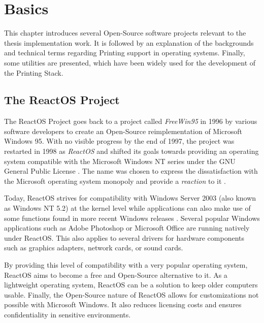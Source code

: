 
\chapter{Basics}
This chapter introduces several Open-Source software projects relevant to the thesis implementation work.
It is followed by an explanation of the backgrounds and technical terms regarding Printing support in operating systems.
Finally, some utilities are presented, which have been widely used for the development of the Printing Stack.


\section{The ReactOS Project}
The ReactOS Project goes back to a project called \emph{FreeWin95} in 1996 by various software developers to create an Open-Source reimplementation of Microsoft Windows 95.
With no visible progress by the end of 1997, the project was restarted in 1998 as \emph{ReactOS} and shifted its goals towards providing an operating system compatible with the Microsoft Windows NT series under the GNU General Public License \cite{reactos1998news}.
The name was chosen to express the dissatisfaction with the Microsoft operating system monopoly and provide a \emph{reaction} to it \cite{sixtus2004reactos}.

Today, ReactOS strives for compatibility with Windows Server 2003 (also known as Windows NT 5.2) at the kernel level while applications can also make use of some functions found in more recent Windows releases \cite{guo2009newsletter54}.
Several popular Windows applications such as Adobe Photoshop or Microsoft Office are running natively under ReactOS.
This also applies to several drivers for hardware components such as graphics adapters, network cards, or sound cards.

By providing this level of compatibility with a very popular operating system, ReactOS aims to become a free and Open-Source alternative to it.
As a lightweight operating system, ReactOS can be a solution to keep older computers usable.
Finally, the Open-Source nature of ReactOS allows for customizations not possible with Microsoft Windows.
It also reduces licensing costs and ensures confidentiality in sensitive environments.


